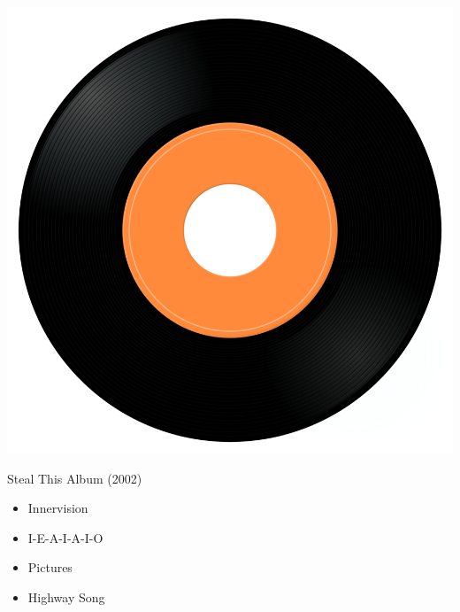 \begin{minipage}[t]{0.25\textwidth}
\captionsetup{type=figure}
\includegraphics[width=\textwidth]{Images/cover.png}
\caption*{Steal This Album (2002)}
\end{minipage}
\begin{minipage}[t]{0.25\textwidth}\vspace{0pt}
\begin{itemize}[nosep,leftmargin=1em,labelwidth=*,align=left]
	\setlength{\itemsep}{0pt}
	\item Innervision
	\item I-E-A-I-A-I-O
	\item Pictures
	\item Highway Song
\end{itemize}
\end{minipage}
